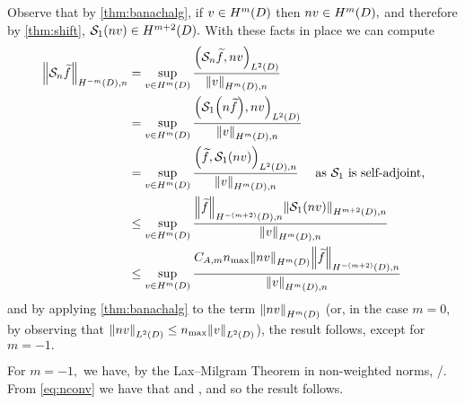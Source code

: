 Observe that by \cref{thm:banachalg}, if $v \in \HmD$ then $nv \in \HmD,$ and therefore by \cref{thm:shift}, $\sdsolo(nv) \in \HmptD.$ With these facts in place we can compute
\begin{align*}
\NHnfn{-m}{D}{\sdsol \ftilde} &= \sup_{v \in \HmD} \frac{\IPLtD{\sdsol \ftilde}{nv}}{\NHmDn{v}}\\
&= \sup_{v \in \HmD} \frac{\IPLtD{\sdsolo\mleft(n \ftilde\mright)}{nv}}{\NHmDn{v}}\\
&= \sup_{v \in \HmD} \frac{\IPLtDn{\ftilde}{\sdsolo\mleft(n v\mright)}}{\NHmDn{v}}\quad\tas \sdsolo \text{ is self-adjoint,}\\
&\leq \sup_{v \in \HmD} \frac{\NHnfn{-(m+2)}{D}{\ftilde}\NHnfn{m+2}{D}{\sdsolo\mleft(nv\mright)} }{\NHmDn{v}}\\
&\leq \sup_{v \in \HmD}  \frac{\CAfn{m} \nmax \NHmD{nv} \NHnfn{-(m+2)}{D}{\ftilde}}{\NHmDn{v}}
\end{align*}
and by applying \cref{thm:banachalg} to the term $\NHfn{m}{D}{nv}$ (or, in the case $m=0$, by observing that $\NLtD{nv} \leq \nmax\NLtD{v}$), the result follows, except for $m=-1.$

For $m=-1,$ we have, by the Lax--Milgram Theorem in non-weighted norms,
\beqs
\NHoD{\Sn \ftilde} \leq {}/\Amin.
\eeqs
From \cref{eq:nconv} we have that
\beqs
{} \leq \nmax \NHoD{\Sn \ftilde}
\eeqs
and
\beqs
{} \leq \nmax {},
\eeqs
and so the result follows.
\epf


